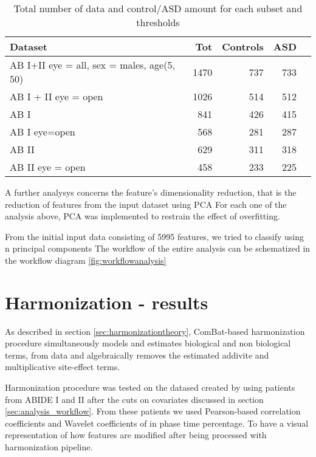 \documentclass[10pt]{report}
\begin{document}
\begin{table}[!htp]\centering
\scriptsize
\begin{tabular}{lrrrr}\toprule
Dataset &Tot &Controls &ASD \\\midrule
AB I+II eye = all, sex = males, age(5, 50) &1470 &737 &733 \\
AB I + II eye = open &1026 &514 &512 \\
AB I &841 &426 &415 \\
AB I eye=open &568 &281 &287 \\
AB II &629 &311 &318 \\
AB II eye = open &458 &233 &225 \\
\bottomrule
\end{tabular}
\caption{Total number of data and control/ASD amount for each subset and thresholds}
\label{tab:controlasd_per_subset}
\end{table}


A further analysys concerns the feature's dimensionality reduction, that is the reduction of features from the input dataset using PCA
For each one of the analysis above, PCA was implemented to restrain the effect of overfitting.

From the initial input data consisting of 5995 features, we tried to classify using n principal components
The workflow of the entire analysis can be schematized in the workflow diagram \ref{fig:workflowanalysis}



\chapter{Harmonization - results}


As described in section \ref{sec:harmonizationtheory}, ComBat-based harmonization procedure simultaneously models and estimates biological and non biological terms, from data and algebraically removes the estimated addivite and multiplicative site-effect terms.

Harmonization procedure was tested on the datased created by using patients from ABIDE I and II after the cuts on covariates discussed in section \ref{sec:analysis_workflow}. From these patients we used Pearson-based correlation coefficients and Wavelet coefficients of in phase time percentage.
To have a visual representation of how features are modified after being processed with harmonization pipeline.
\end{document}

